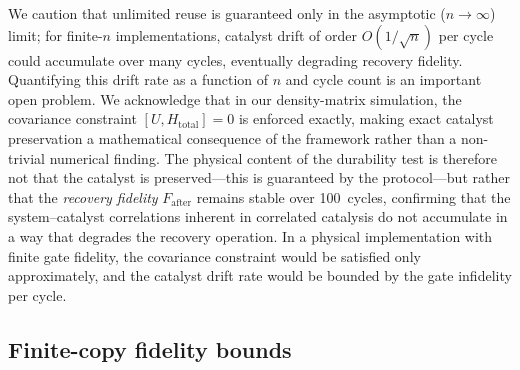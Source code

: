 \documentclass[prx,twocolumn,superscriptaddress,longbibliography,floatfix]{revtex4-2}
\begin{document}
We caution that unlimited reuse is guaranteed only in the asymptotic ($n \to \infty$) limit; for finite-$n$ implementations, catalyst drift of order $O(1/\sqrt{n})$ per cycle could accumulate over many cycles, eventually degrading recovery fidelity.
Quantifying this drift rate as a function of $n$ and cycle count is an important open problem.
We acknowledge that in our density-matrix simulation, the covariance constraint $[U, H_\mathrm{total}] = 0$ is enforced exactly, making exact catalyst preservation a mathematical consequence of the framework rather than a non-trivial numerical finding.
The physical content of the durability test is therefore not that the catalyst is preserved---this is guaranteed by the protocol---but rather that the \emph{recovery fidelity} $F_\mathrm{after}$ remains stable over 100~cycles, confirming that the system--catalyst correlations inherent in correlated catalysis do not accumulate in a way that degrades the recovery operation.
In a physical implementation with finite gate fidelity, the covariance constraint would be satisfied only approximately, and the catalyst drift rate would be bounded by the gate infidelity per cycle.

\subsection{Finite-copy fidelity bounds}
\label{sec:finite_copy}
\end{document}
